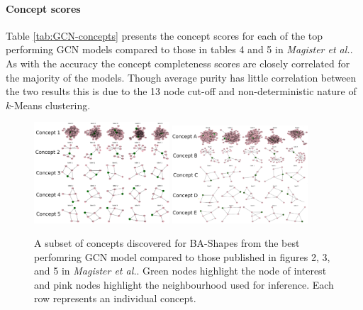 \paragraph{Concept scores}

Table \ref{tab:GCN-concepts} presents the concept scores for each of the top performing GCN models compared to those in tables 4 and 5 in \textit{Magister et al.}.
As with the accuracy the concept completeness scores are closely correlated for the majority of the models.
%
Though average purity has little correlation between the two results this is due to the 13 node cut-off and non-deterministic nature of $k$-Means clustering.


\begin{figure}
    \centering
    \includegraphics[width=0.45\textwidth]{figures/GCN-BA-Shapes}
    \includegraphics[width=0.45\textwidth]{figures/Magister-BA-Shapes}
    \caption{A subset of concepts discovered for BA-Shapes from the best perfomring GCN model compared to those published in figures 2, 3, and 5 in \textit{Magister et al.}\cite{magister2021gcexplainer}. Green nodes highlight the node of interest and pink nodes highlight the neighbourhood used for inference. Each row represents an individual concept.}
    \label{fig:GCN-BA-Shapes}
\end{figure}

